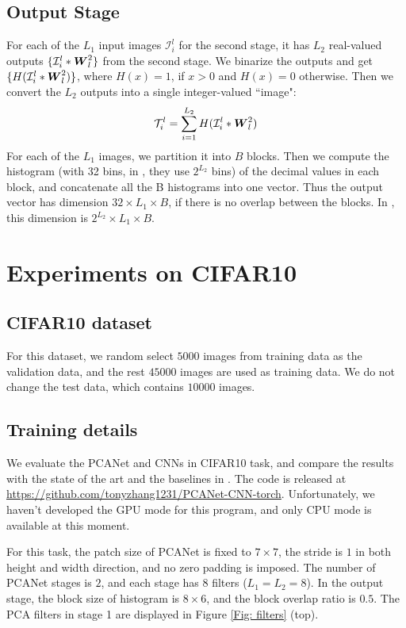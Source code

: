 \documentclass[10pt,twocolumn,letterpaper]{article}
\begin{document}
\subsection{Output Stage} \label{subsection: Output Stage}
For each of the $L_1$ input images $\mathcal{I}_i^l$ for the second stage, it has $L_2$ real-valued outputs $ \{\mathcal{I}_i^l * \boldsymbol{W}_l^2 \}$ from the second stage. We binarize the outputs and get $\{H(\mathcal{I}_i^l * \boldsymbol{W}_l^2) \}$, where $H(x)=1$, if $x>0$ and $H(x)=0$ otherwise. Then we convert the $L_2$ outputs into a single integer-valued ``image":
\begin{eqnarray*}
	\mathcal{T}_i^l=\sum_{i=1}^{L_2} H(\mathcal{I}_i^l * \boldsymbol{W}_l^2)
\end{eqnarray*} 
For each of the $L_1$ images, we partition it into $B$ blocks. Then we compute the histogram (with 32 bins, in \cite{chan2015pcanet}, they use $2^{L_2}$ bins) of the decimal values in each block, and concatenate all the B histograms into one vector. Thus the output vector has dimension $32 \times L_1 \times B$, if there is no overlap between the blocks. In \cite{chan2015pcanet}, this dimension is $2^{L_2} \times L_1 \times B$.

\section{Experiments on CIFAR10}
\subsection{CIFAR10 dataset}
For this dataset, we random select $5000$ images from training data as the validation data, and the rest $45000$ images are used as training data. We do not change the test data, which contains $10000$ images. 

\subsection{Training details}
We evaluate the PCANet and CNNs in CIFAR10 task, and compare the results with the state of the art and the baselines in \cite{chan2015pcanet}. The code is released at \url{https://github.com/tonyzhang1231/PCANet-CNN-torch}. Unfortunately, we haven't developed the GPU mode for this program, and only CPU mode is available at this moment.

For this task, the patch size of PCANet is fixed to $7 \times 7$, the stride is $1$ in both height and width direction, and no zero padding is imposed. The number of PCANet stages is $2$, and each stage has $8$ filters ($L_1=L_2=8$). In the output stage, the block size of histogram is $8 \times 6$, and the block overlap ratio is $0.5$. The PCA filters in stage 1 are displayed in Figure \ref{Fig: filters} (top).
\end{document}
